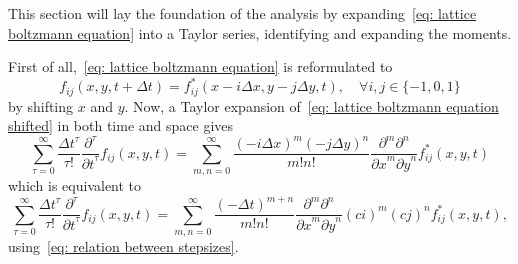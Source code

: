 This section will lay the foundation of the analysis by expanding~\eqref{eq: lattice boltzmann equation} into a Taylor series, identifying and expanding the moments.

First of all,~\eqref{eq: lattice boltzmann equation} is reformulated to
\begin{equation}
  \label{eq: lattice boltzmann equation shifted}
  f_{ij}(x, y, t + \Delta t) = f^*_{ij}(x - i \Delta x , y - j\Delta y, t), \quad\forall i,j\in \{-1, 0, 1\}
\end{equation}
by shifting $x$ and $y$. Now, a Taylor expansion of~\eqref{eq: lattice boltzmann equation shifted} in both time and space gives
\begin{equation*}
  \sum_{\tau = 0}^\infty \frac{{\Delta t}^\tau }{\tau!} \frac{\partial^\tau}{{\partial t}^\tau} f_{ij}(x, y, t) =
  \sum_{m,n = 0}^\infty \frac{{(-i\Delta x)}^m{(-j\Delta y)}^n} {m!n!} \frac{\partial^m \partial^n}{ {\partial x}^m{\partial y}^n} f^*_{ij}(x, y, t)
\end{equation*}
which is equivalent to
\begin{equation}
  \label{eq: Taylor LB1}
  \sum_{\tau = 0}^\infty \frac{{\Delta t}^\tau }{\tau!} \frac{\partial^\tau}{{\partial t}^\tau} f_{ij}(x, y, t) =
    \sum_{m,n = 0}^\infty \frac{{(-\Delta t)}^{m+n}} {m!n!} \frac{\partial^m \partial^n}{ {\partial x}^m{\partial y}^n} {(ci)}^m {(cj)}^n f^*_{ij}(x, y, t),
\end{equation}
using~\eqref{eq: relation between stepsizes}.

